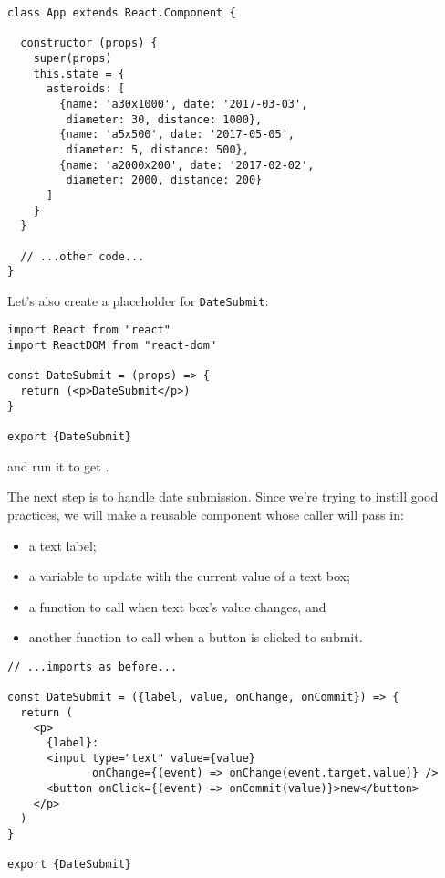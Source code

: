 \begin{verbatim}
class App extends React.Component {

  constructor (props) {
    super(props)
    this.state = {
      asteroids: [
        {name: 'a30x1000', date: '2017-03-03',
         diameter: 30, distance: 1000},
        {name: 'a5x500', date: '2017-05-05',
         diameter: 5, distance: 500},
        {name: 'a2000x200', date: '2017-02-02',
         diameter: 2000, distance: 200}
      ]
    }
  }

  // ...other code...
}
\end{verbatim}

\noindent
Let's also create a placeholder for \texttt{DateSubmit}:

\begin{verbatim}
import React from "react"
import ReactDOM from "react-dom"

const DateSubmit = (props) => {
  return (<p>DateSubmit</p>)
}

export {DateSubmit}
\end{verbatim}

\noindent
and run it to get .


The next step is to handle date submission.
Since we're trying to instill good practices,
we will make a reusable component whose caller will pass in:

\begin{itemize}
\item
  a text label;
\item
  a variable to update with the current value of a text box;
\item
  a function to call when text box's value changes, and
\item
  another function to call when a button is clicked to submit.
\end{itemize}

\begin{verbatim}
// ...imports as before...

const DateSubmit = ({label, value, onChange, onCommit}) => {
  return (
    <p>
      {label}:
      <input type="text" value={value}
             onChange={(event) => onChange(event.target.value)} />
      <button onClick={(event) => onCommit(value)}>new</button>
    </p>
  )
}

export {DateSubmit}
\end{verbatim}

